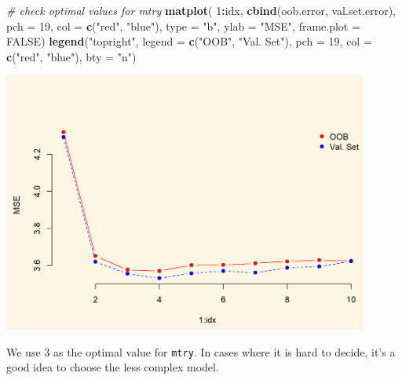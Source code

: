 \documentclass[]{article}
\newenvironment{Shaded}{\begin{snugshade}}{\end{snugshade}}
\newcommand{\CommentTok}[1]{\textcolor[rgb]{0.56,0.35,0.01}{\textit{#1}}}
\newcommand{\DataTypeTok}[1]{\textcolor[rgb]{0.13,0.29,0.53}{#1}}
\newcommand{\DecValTok}[1]{\textcolor[rgb]{0.00,0.00,0.81}{#1}}
\newcommand{\KeywordTok}[1]{\textcolor[rgb]{0.13,0.29,0.53}{\textbf{#1}}}
\newcommand{\NormalTok}[1]{#1}
\newcommand{\OperatorTok}[1]{\textcolor[rgb]{0.81,0.36,0.00}{\textbf{#1}}}
\newcommand{\OtherTok}[1]{\textcolor[rgb]{0.56,0.35,0.01}{#1}}
\newcommand{\StringTok}[1]{\textcolor[rgb]{0.31,0.60,0.02}{#1}}
\begin{document}
\begin{Shaded}
\begin{Highlighting}[]
\CommentTok{# check optimal values for mtry}
\KeywordTok{matplot}\NormalTok{( }\DecValTok{1}\OperatorTok{:}\NormalTok{idx, }\KeywordTok{cbind}\NormalTok{(oob.error, val.set.error), }\DataTypeTok{pch =} \DecValTok{19}\NormalTok{, }\DataTypeTok{col =} \KeywordTok{c}\NormalTok{(}\StringTok{"red"}\NormalTok{, }\StringTok{"blue"}\NormalTok{),}
         \DataTypeTok{type =} \StringTok{"b"}\NormalTok{, }\DataTypeTok{ylab =} \StringTok{"MSE"}\NormalTok{, }\DataTypeTok{frame.plot =} \OtherTok{FALSE}\NormalTok{)}
\KeywordTok{legend}\NormalTok{(}\StringTok{"topright"}\NormalTok{, }\DataTypeTok{legend =} \KeywordTok{c}\NormalTok{(}\StringTok{"OOB"}\NormalTok{, }\StringTok{"Val. Set"}\NormalTok{), }\DataTypeTok{pch =} \DecValTok{19}\NormalTok{, }\DataTypeTok{col =} \KeywordTok{c}\NormalTok{(}\StringTok{"red"}\NormalTok{, }\StringTok{"blue"}\NormalTok{),}
       \DataTypeTok{bty =} \StringTok{"n"}\NormalTok{)}
\end{Highlighting}
\end{Shaded}

\includegraphics[width=0.9\textwidth,height=\textheight]{./img/unnamed-chunk-161-1.png}

We use 3 as the optimal value for \texttt{mtry}. In cases where it is hard to decide, it's a good idea to choose the less complex model.
\end{document}
